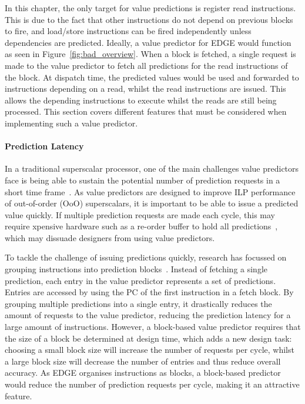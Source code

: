 In this chapter, the only target for value predictions is register read instructions.
This is due to the fact that other instructions do not depend on previous blocks to fire, and load/store instructions can be fired independently unless dependencies are predicted.
Ideally, a value predictor for EDGE would function as seen in Figure~\ref{fig:bad_overview}.
When a block is fetched, a single request is made to the value predictor to fetch all predictions for the read instructions of the block.
At dispatch time, the predicted values would be used and forwarded to instructions depending on a read, whilst the read instructions are issued.
This allows the depending instructions to execute whilst the reads are still being processed.
This section covers different features that must be considered when implementing such a value predictor.


\paragraph*{Prediction Latency}
In a traditional superscalar processor, one of the main challenges value predictors face is being able to sustain the potential number of prediction requests in a short time frame~\cite{peraisBeBop2015}.
As value predictors are designed to improve ILP performance of out-of-order (OoO) superscalars, it is important to be able to issue a predicted value quickly.
If multiple prediction requests are made each cycle, this may require xpensive hardware such as a re-order buffer to hold all predictions~\cite{peraisBeBop2015}, which may dissuade designers from using value predictors.

To tackle the challenge of issuing predictions quickly, research has focussed on grouping instructions into prediction blocks~\cite{peraisBeBop2015}.
Instead of fetching a single prediction, each entry in the value predictor represents a set of predictions.
Entries are accessed by using the PC of the first instruction in a fetch block.
By grouping multiple predictions into a single entry, it drastically reduces the amount of requests to the value predictor, reducing the prediction latency for a large amount of instructions.
However, a block-based value predictor requires that the size of a block be determined at design time, which adds a new design task: choosing a small block size will increase the number of requests per cycle, whilst a large block size will decrease the number of entries and thus reduce overall accuracy.
As EDGE organises instructions as blocks, a block-based predictor would reduce the number of prediction requests per cycle, making it an attractive feature.


